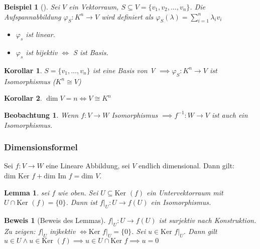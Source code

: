 \documentclass[11pt]{article}
\newcommand{\mdim}{\text{dim }}
\newcommand{\mKer}{\text{Ker }}
\newcommand{\mIm}{\text{Im }}
\newtheorem{exa}{Beispiel}[section]
\newtheorem*{prof}{Beweis}
\newtheorem*{lemma}{Lemma}
\newtheorem*{korollar}{Korollar}
\newtheorem*{beobachtung}{Beobachtung}
\begin{document}
\begin{exa}[] \label{}
Sei \(V\) ein Vektorraum, \(S\subseteq V = \{v_1, v_2, ..., v_n\}\). Die
Aufspannabbildung $\varphi_S: K^n \rightarrow V$ wird definiert als $\varphi_S(\lambda)=\sum_{i=1}^{n}\lambda_i v_i$

\begin{itemize}
	\item \(\varphi_s\) ist linear.
	\item \(\varphi_s\) ist bijektiv \(\iff\) S ist Basis.
\end{itemize}
\end{exa}

\begin{korollar}
	\(S=\{v_1,\ldots,v_n\}\) ist eine Basis von V $\implies \varphi_S: K^n \rightarrow V$ ist Isomorphismus ($K^n\cong V$)
\end{korollar}

\begin{korollar}
	\(\dim V = n \iff V\cong K^n\)
\end{korollar}

\begin{beobachtung}
	Wenn \(f:V\rightarrow W\) Isomorphismus $\implies f^{-1}:W\rightarrow V $ ist auch ein Isomorphismus.
\end{beobachtung}

\subsubsection{Dimensionsformel}
\label{sec:org9a58004}
\begin{theo}{}{}
Sei \(f:V\to W\) eine Lineare Abbildung, sei \(V\) endlich dimensional. Dann gilt: \(\mdim\mKer f + \mdim\mIm f = \mdim V\).
\end{theo}

\begin{lemma} sei \(f\) wie oben. Sei \(U \subseteq \mKer(f)\) ein Untervektorraum mit \(U \cap \mKer(f) = \{0\}\).  Dann ist \(f|_U:U\to f(U)\) ein Isomorphismus.
\end{lemma}

\begin{prof}[Beweis des Lemmas] \label{}
\(f|_U:U\to f(U)\) ist surjektiv nach Konstruktion. Zu zeigen: \(f|_U\) injkektiv \(\iff \mKer f|_U = \{0\}\). Sei \(u\in \mKer f|_U \). Dann gilt \(u\in U \land u \in \mKer(f) \implies u \in U \cap \mKer f \implies u = 0\)
\end{prof}
\end{document}
